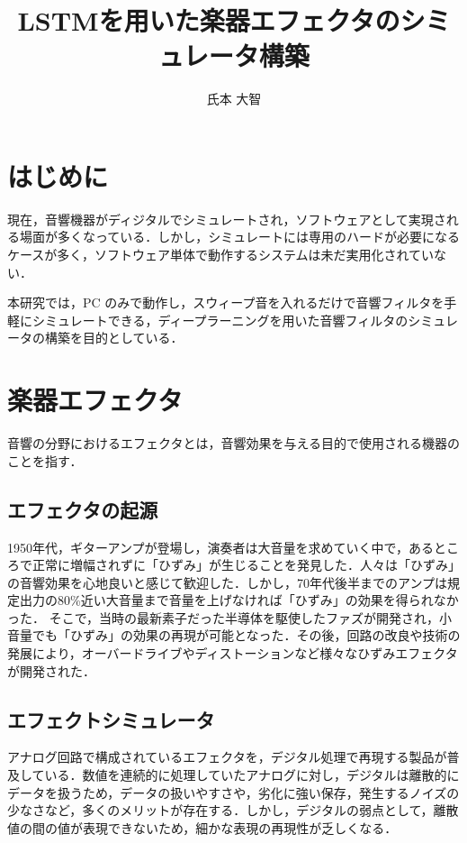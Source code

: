 \documentclass{jreport}		%
\title{LSTMを用いた楽器エフェクタのシミュレータ構築}	%
\author{氏本 大智}			%
\begin{document}
%
\maketitle		%
\tableofcontents	%

\chapter{はじめに}
現在，音響機器がディジタルでシミュレートされ，ソフトウェアとして実現される場面が多くなっている．しかし，シミュレートには専用のハードが必要になるケースが多く，ソフトウェア単体で動作するシステムは未だ実用化されていない．

本研究では，PC のみで動作し，スウィープ音を入れるだけで音響フィルタを手軽にシミュレートできる，ディープラーニングを用いた音響フィルタのシミュレータの構築を目的としている．

\chapter{楽器エフェクタ}
音響の分野におけるエフェクタとは，音響効果を与える目的で使用される機器のことを指す．

\section{エフェクタの起源}
1950年代，ギターアンプが登場し，演奏者は大音量を求めていく中で，あるところで正常に増幅されずに「ひずみ」が生じることを発見した．人々は「ひずみ」の音響効果を心地良いと感じて歓迎した．しかし，70年代後半までのアンプは規定出力の80\%近い大音量まで音量を上げなければ「ひずみ」の効果を得られなかった．
そこで，当時の最新素子だった半導体を駆使したファズが開発され，小音量でも「ひずみ」の効果の再現が可能となった．その後，回路の改良や技術の発展により，オーバードライブやディストーションなど様々なひずみエフェクタが開発された．

\section{エフェクトシミュレータ}
アナログ回路で構成されているエフェクタを，デジタル処理で再現する製品が普及している．数値を連続的に処理していたアナログに対し，デジタルは離散的にデータを扱うため，データの扱いやすさや，劣化に強い保存，発生するノイズの少なさなど，多くのメリットが存在する．しかし，デジタルの弱点として，離散値の間の値が表現できないため，細かな表現の再現性が乏しくなる．
\end{document}
